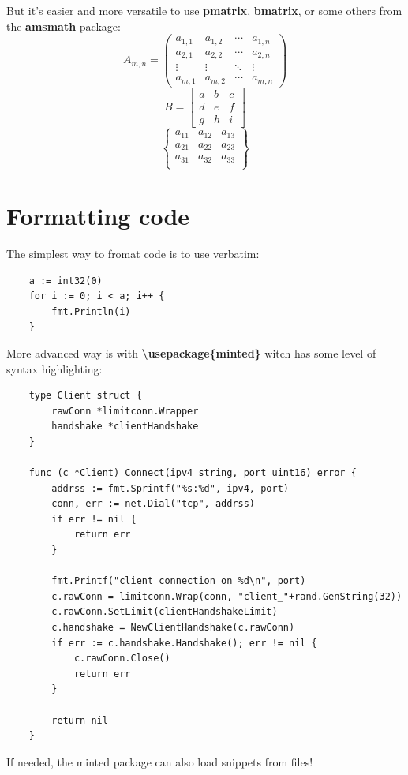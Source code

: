 \documentclass[12pt]{article}
\begin{document}
\noindent But it's easier and more versatile to use \textbf{pmatrix}, \textbf{bmatrix}, or some others from the \textbf{amsmath} package: \\
\begin{equation*}
    A_{m,n} =
    \begin{pmatrix}
    a_{1,1} & a_{1,2} & \cdots & a_{1,n} \\
    a_{2,1} & a_{2,2} & \cdots & a_{2,n} \\
    \vdots  & \vdots  & \ddots & \vdots  \\
    a_{m,1} & a_{m,2} & \cdots & a_{m,n}
    \end{pmatrix}
\end{equation*}
\begin{equation*}
    B =
    \begin{bmatrix}
    a & b & c \\
    d & e & f \\
    g & h & i
    \end{bmatrix}
\end{equation*}
\begin{equation*}
    \begin{Bmatrix}
    a_{11} & a_{12} & a_{13}  \\
    a_{21} & a_{22} & a_{23}  \\
    a_{31} & a_{32} & a_{33}  \\
    \end{Bmatrix}
\end{equation*}

\section{Formatting code}

The simplest way to fromat code is to use verbatim:
\begin{verbatim}
    a := int32(0)
    for i := 0; i < a; i++ {
        fmt.Println(i)
    }
\end{verbatim}

\noindent More advanced way is with \textbf{\textbackslash usepackage\{minted\}} witch has some level of syntax highlighting:
\begin{verbatim}
    type Client struct {
        rawConn *limitconn.Wrapper
        handshake *clientHandshake
    }

    func (c *Client) Connect(ipv4 string, port uint16) error {
        addrss := fmt.Sprintf("%s:%d", ipv4, port)
        conn, err := net.Dial("tcp", addrss)
        if err != nil {
            return err
        }

        fmt.Printf("client connection on %d\n", port)
        c.rawConn = limitconn.Wrap(conn, "client_"+rand.GenString(32))
        c.rawConn.SetLimit(clientHandshakeLimit)
        c.handshake = NewClientHandshake(c.rawConn)
        if err := c.handshake.Handshake(); err != nil {
            c.rawConn.Close()
            return err
        }

        return nil
    }
\end{verbatim}

\noindent If needed, the minted package can also load snippets from files!

\newpage
\printbibliography
\end{document}
